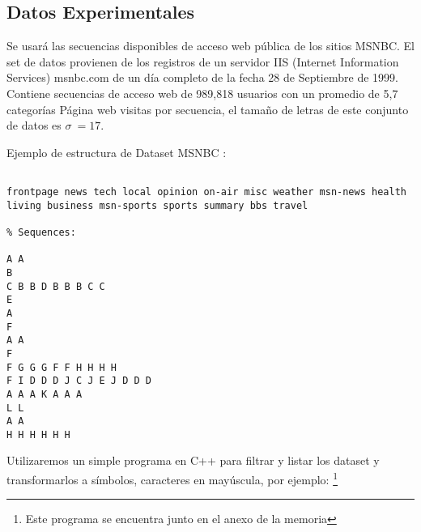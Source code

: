 






\subsection{Datos Experimentales}

Se usará las secuencias disponibles de acceso web pública de los sitios MSNBC. El set de datos provienen de los registros de un servidor IIS (Internet Information Services) msnbc.com de un día completo de la fecha  28 de Septiembre de 1999. 
Contiene secuencias de acceso web de 989,818 usuarios con un promedio de 5,7  categorías Página web visitas por secuencia, el tamaño de letras de este conjunto de datos es $\sigma \ = 17$.


Ejemplo de estructura de Dataset MSNBC :
\vspace{1cm}

\begin{lstlisting}[frame=single,basicstyle=\ttfamily\tiny,]
% Different categories found in input file:

frontpage news tech local opinion on-air misc weather msn-news health living business msn-sports sports summary bbs travel

% Sequences:

A A 
B 
C B B D B B B C C 
E 
A 
F 
A A 
F 
F G G G F F H H H H 
F I D D D J C J E J D D D 
A A A K A A A 
L L 
A A 
H H H H H H 
\end{lstlisting}





Utilizaremos un simple programa en C++ para filtrar y listar los dataset y transformarlos a símbolos, caracteres en mayúscula, por ejemplo: 
\footnote{Este programa se encuentra junto en el anexo de la memoria}

